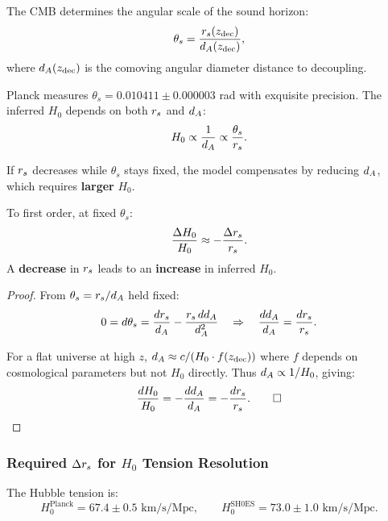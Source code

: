 The CMB determines the angular scale of the sound horizon:
\begin{equation}
\theta_s = \frac{r_s(z_{\mathrm{dec}})}{d_A(z_{\mathrm{dec}})},
\end{equation}
where $d_A(z_{\mathrm{dec}})$ is the comoving angular diameter distance to decoupling.

Planck measures $\theta_s = 0.010411 \pm 0.000003$ rad with exquisite precision. The inferred $H_0$ depends on both $r_s$ and $d_A$:
\begin{equation}
H_0 \propto \frac{1}{d_A} \propto \frac{\theta_s}{r_s}.
\end{equation}

If $r_s$ decreases while $\theta_s$ stays fixed, the model compensates by reducing $d_A$, which requires \textbf{larger} $H_0$.

\begin{proposition}
\label{prop:rs_to_H0}
To first order, at fixed $\theta_s$:
\begin{equation}
\frac{\Delta H_0}{H_0} \approx -\frac{\Delta r_s}{r_s}.
\end{equation}
A \textbf{decrease} in $r_s$ leads to an \textbf{increase} in inferred $H_0$.
\end{proposition}

\begin{proof}
From $\theta_s = r_s/d_A$ held fixed:
\begin{equation}
0 = d\theta_s = \frac{dr_s}{d_A} - \frac{r_s \, dd_A}{d_A^2} \quad \Rightarrow \quad \frac{dd_A}{d_A} = \frac{dr_s}{r_s}.
\end{equation}

For a flat universe at high $z$, $d_A \approx c/(H_0 \cdot f(z_{\mathrm{dec}}))$ where $f$ depends on cosmological parameters but not $H_0$ directly. Thus $d_A \propto 1/H_0$, giving:
\begin{equation}
\frac{dH_0}{H_0} = -\frac{dd_A}{d_A} = -\frac{dr_s}{r_s}. \qed
\end{equation}
\end{proof}

\subsubsection{Required $\Delta r_s$ for $H_0$ Tension Resolution}

The Hubble tension is:
\begin{equation}
H_0^{\mathrm{Planck}} = 67.4 \pm 0.5 \text{ km/s/Mpc}, \qquad H_0^{\mathrm{SH0ES}} = 73.0 \pm 1.0 \text{ km/s/Mpc}.
\end{equation}

